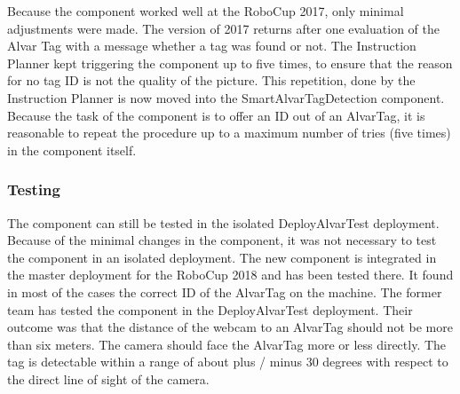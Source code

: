 Because the component worked well at the RoboCup 2017, only minimal adjustments were made. The version of 2017 returns after one evaluation of the Alvar Tag with a message whether a tag was found or not. The Instruction Planner kept triggering the component up to five times, to ensure that the reason for no tag ID is not the quality of the picture. 
This repetition, done by the Instruction Planner is now moved into the SmartAlvarTagDetection component. Because the task of the component is to offer an ID out of an AlvarTag, it is reasonable to repeat the procedure up to a maximum number of tries (five times) in the component itself.


\subsubsection{Testing}

The component can still be tested in the isolated DeployAlvarTest deployment. Because of the minimal changes in the component, it was not necessary to test the component in an isolated deployment. The new component is integrated in the master deployment for the RoboCup 2018 and has been tested there. It found in most of the cases the correct ID of the AlvarTag on the machine.
The former team has tested the component in the DeployAlvarTest deployment. Their outcome was that the distance of the webcam to an AlvarTag should not be more than six meters. 
The camera should face the AlvarTag more or less directly. The tag is detectable within a range of about plus / minus 30 degrees with respect to the direct line of sight of the camera.
